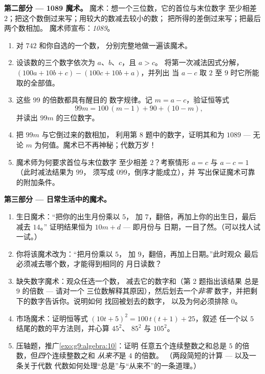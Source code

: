 \begin{problem}
\medskip
\noindent\textbf{第二部分 --- 1089 魔术。}
魔术：想一个三位数，它的首位与末位数字
至少相差 $2$；把这个数倒过来写；用较大的数减去较小的数；
把所得的差倒过来写；把最后两个数相加。
魔术师宣布：\emph{1089}。
\begin{enumerate}[resume]
  \item 对 $742$ 和你自选的一个数，
        分别完整地做一遍该魔术。
  \item 设该数的三个数字依次为 $a$、$b$、$c$，且 $a > c$。
        将第一次减法因式分解，
        $(100a + 10b + c) - (100c + 10b + a)$，并列出
        当 $a - c$ 取 $2$ 至 $9$ 时它所能取的全部值。
  \item 这些 $99$ 的倍数都具有醒目的
        数字规律。记 $m = a - c$，验证恒等式
        \[
        99m = 100\,(m - 1) + 90 + (10 - m),
        \]
        并读出 $99m$ 的三位数字。
  \item 把 $99m$ 与它倒过来的数相加，
        利用第 8 题中的数字，证明其和为 $1089$ ---
        无论 $m$ 为何值。魔术已不再神秘；代数万岁！
  \item 魔术师为何要求首位与末位数字
        至少相差 $2$？考察情形 $a = c$ 与
        $a - c = 1$（此时减法结果为 $99$，
        须写成 $099$，倒序才能成立），并
        写出保证魔术可靠的附加条件。
\end{enumerate}

\medskip
\noindent\textbf{第三部分 --- 日常生活中的魔术。}
\begin{enumerate}[resume]
  \item 生日魔术：“把你的出生月份乘以 $5$，
        加 $7$，翻倍，再加上你的出生日，最后减去 $14$。”
        证明结果恒为 $10m + d$ --- 即月份与
        日期，一目了然。（可以找人试一试。）
  \item 你将该魔术改为：“把月份乘以 $5$，
        加 $9$，翻倍，再加上日期。”此时观众
        最后必须减去哪个数，才能得到相同的
        月日读数？
  \item 缺失数字魔术：观众任选一个数，
        减去它的数字和（第 2 题指出该结果
        总是 $9$ 的倍数 --- 请对一个
        三位数解释其原因），然后划去一个\emph{非零}
        数字，并把剩下的数字告诉你。说明如何
        找回被划去的数字，
        以及为何必须排除 $0$。
  \item 市场魔术：证明恒等式
        $(10t + 5)^2 = 100\,t(t+1) + 25$，叙述
        任一个以 $5$ 结尾的数的平方法则，并心算 $45^2$、
        $85^2$ 与 $105^2$。
  \item 压轴题，推广\cref{exo:g9:algebra:10}：证明
        任意五个连续整数之和总是
        $5$ 的倍数，但\emph{四}个连续整数之和
        \emph{从来不}是 $4$ 的倍数。
        （两段简短的计算 --- 以及一条关于代数
        代数如何处理“总是”与“从来不”的一条道理。）
\end{enumerate}
\end{problem}
